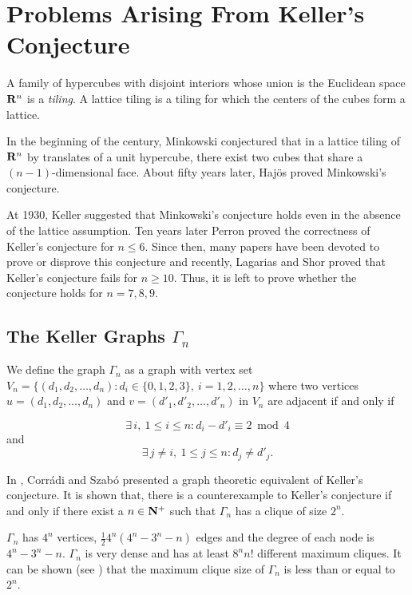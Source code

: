 \section{Problems Arising From Keller's Conjecture}

A family of hypercubes with disjoint interiors whose union is the Euclidean
space ${\bf R}^{n}$ is a {\em tiling}. A lattice tiling is a tiling for which
the centers of the cubes form a lattice.

In the beginning of the century, Minkowski conjectured that in a
lattice tiling of ${\bf R}^{n}$ by translates of a unit hypercube,
there exist two cubes that share a $(n-1)$-dimensional face. About
fifty years later, Haj\"{o}s \cite{Haj} proved Minkowski's conjecture.

At 1930, Keller suggested that Minkowski's conjecture holds even in
the absence of the lattice assumption. Ten years later Perron
\cite{Per} proved the correctness of Keller's conjecture for $n \leq
6$. Since then, many papers have been devoted to prove or disprove
this conjecture and recently, Lagarias and Shor \cite{Lag} proved that
Keller's conjecture fails for $n \geq 10$. Thus, it is left to prove
whether the conjecture holds for $n = 7,8,9$.

\subsection{The Keller Graphs $\Gamma_{n}$}

We define the graph $\Gamma_{n}$ as a graph with vertex set $V_{n} =
\{(d_{1},d_{2},\ldots,d_{n}) : d_{i} \in \{0,1,2,3\},\
i=1,2,\ldots,n\}$ where two vertices $u = (d_{1},d_{2},\ldots,d_{n})$
and $v = (d'_{1},d'_{2},\ldots,d'_{n})$ in $V_{n}$ are adjacent if and
only if 

\begin{equation}
\exists\, i,\ 1 \leq i \leq n : d_{i}-d'_{i} \equiv {2 \bmod 4}
\label{eq:kgrt}
\end{equation}
and
\begin{equation}
\exists\, j \neq i,\ 1 \leq j \leq n : d_{j} \neq d'_{j}.
\label{eq:diff}
\end{equation}

In \cite{Cor}, Corr\'{a}di and Szab\'{o} presented a graph theoretic equivalent
of Keller's conjecture. It is shown that, there is a
counterexample to Keller's conjecture if and only if there exist a
$n \in {\bf N^{+}}$ such that $\Gamma_{n}$ has a clique of size $2^{n}$.

$\Gamma_{n}$ has $4^{n}$ vertices, $\frac{1}{2} 4^{n}(4^{n}-3^{n}-n)$
edges and the degree of each node is $4^{n}-3^{n}-n$. $\Gamma_{n}$ is
very dense and has at least $8^{n}n!$ different maximum cliques. It can be
shown (see \cite{Lag}) that the maximum clique size of $\Gamma_{n}$ is less than
or equal to $2^{n}$.

